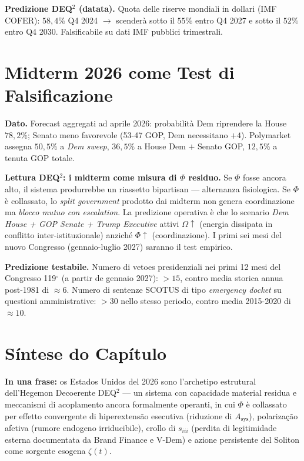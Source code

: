 \Conj{} \textbf{Predizione DEQ$^2$ (datata).} Quota delle riserve mondiali
in dollari (IMF COFER): \(58{,}4\%\) Q4 2024 \(\to\) scenderà sotto il
\(55\%\) entro Q4 2027 e sotto il \(52\%\) entro Q4 2030. Falsificabile
su dati IMF pubblici trimestrali.



\section{Midterm 2026 come Test di
Falsificazione}\label{midterm-2026-come-test-di-falsificação}

\Proved{} \textbf{Dato.} Forecast aggregati ad aprile 2026: probabilità
Dem riprendere la House \(78{,}2\%\); Senato meno favorevole (53-47 GOP,
Dem necessitano \(+4\)). Polymarket assegna \(50{,}5\%\) a \emph{Dem
sweep}, \(36{,}5\%\) a House Dem \(+\) Senato GOP, \(12{,}5\%\) a tenuta
GOP totale.

\Hypoth{} \textbf{Lettura DEQ$^2$: i midterm come misura di \(\Phi\)
residuo.} Se \(\Phi\) fosse ancora alto, il sistema produrrebbe un
riassetto bipartisan --- alternanza fisiologica. Se \(\Phi\) è
collassato, lo \emph{split government} prodotto dai midterm non genera
coordinazione ma \emph{blocco mutuo con escalation}. La predizione
operativa è che lo scenario \emph{Dem House + GOP Senate + Trump
Executive} attivi \(\Omega \uparrow\) (energia dissipata in conflitto
inter-istituzionale) anziché \(\Phi \uparrow\) (coordinazione). I primi
sei mesi del nuovo Congresso (gennaio-luglio 2027) saranno il test
empirico.

\Conj{} \textbf{Predizione testabile.} Numero di vetoes presidenziali
nei primi 12 mesi del Congresso 119$^\circ$ (a partir de gennaio 2027):
\(> 15\), contro media storica annua post-1981 di \(\approx 6\). Numero
di sentenze SCOTUS di tipo \emph{emergency docket} su questioni
amministrative: \(> 30\) nello stesso periodo, contro media 2015-2020 di
\(\approx 10\).



\section{Síntese do Capítulo}\label{sintesi-del-capítulo}

\Proved{} \textbf{In una frase:} os Estados Unidos del 2026 sono
l'archetipo estrutural dell'Hegemon Decoerente DEQ$^2$ --- un sistema con
capacidade material residua e meccanismi di acoplamento ancora
formalmente operanti, in cui \(\Phi\) è collassato per effetto
convergente di hiperextensão esecutiva (riduzione di
\(A_{\text{sys}}\)), polarização afetiva (rumore endogeno
irriducibile), crollo di \(s_{iii}\) (perdita di legitimidade esterna
documentata da Brand Finance e V-Dem) e azione persistente del Soliton
come sorgente esogena \(\zeta(t)\).

